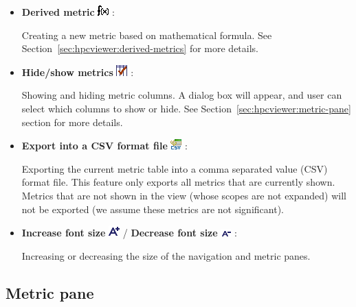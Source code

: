 \begin{itemize}
\item \textbf{Derived metric} \includegraphics[scale=.8]{fig/hpcviewer-button-derivedmetric.png} :

Creating a new metric based on mathematical formula.
See Section~\ref{sec:hpcviewer:derived-metrics} for more details.

\item \textbf{Hide/show metrics} \includegraphics[scale=.8]{fig/hpcviewer-button-checkcolumns.png} :

Showing and hiding metric columns.
A dialog box will appear, and user can select which columns to show or hide.
See Section~\ref{sec:hpcviewer:metric-pane} section for more details.

\item \textbf{Export into a CSV format file} \includegraphics[scale=.8]{fig/hpcviewer-button-csv.png} :

Exporting the current metric table into a comma separated value (CSV) format file.
This feature only exports all metrics that are currently shown.
Metrics that are not shown in the view (whose scopes are not expanded) will not be exported (we assume these metrics are not significant).

\item \textbf{Increase font size} \includegraphics[scale=.8]{fig/hpcviewer-button-fontplus.png} /
      \textbf{Decrease font size} \includegraphics[scale=.8]{fig/hpcviewer-button-fontminus.png} :

Increasing or decreasing the size of the navigation and metric panes.

\end{itemize}


\subsection{Metric pane}

